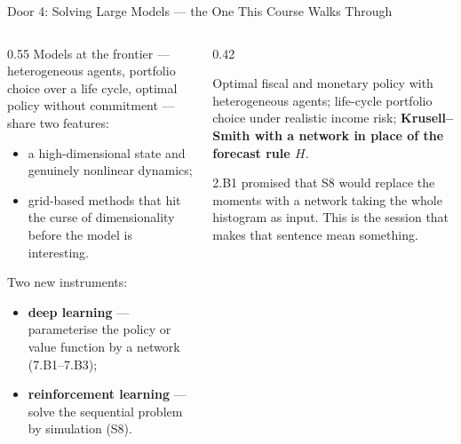 \begin{frame}{Door 4: Solving Large Models --- the One This Course Walks Through}
\begin{columns}[T]
\begin{column}{0.55\textwidth}
\small
Models at the frontier --- heterogeneous agents, portfolio choice over a life cycle, optimal policy without commitment --- share two features:
\medskip
\begin{itemize}\small\setlength{\itemsep}{1mm}
  \item a high-dimensional state and genuinely nonlinear dynamics;
  \item grid-based methods that hit the curse of dimensionality before the model is interesting.
\end{itemize}
\medskip

Two new instruments:
\begin{itemize}\small\setlength{\itemsep}{1mm}
  \item \textbf{deep learning} --- parameterise the policy or value function by a network (7.B1--7.B3);
  \item \textbf{reinforcement learning} --- solve the sequential problem by simulation (S8).
\end{itemize}
\end{column}
\begin{column}{0.42\textwidth}
\begin{examplebox}[title=\textbf{Where it has been done}]\small
Optimal fiscal and monetary policy with heterogeneous agents; life-cycle portfolio choice under realistic income risk; \textbf{Krusell--Smith with a network in place of the forecast rule $H$}.
\end{examplebox}
\medskip
\begin{takeawaybox}\footnotesize
2.B1 promised that S8 would replace the moments with a network taking the whole histogram as input. This is the session that makes that sentence mean something.
\end{takeawaybox}
\end{column}
\end{columns}
\end{frame}

